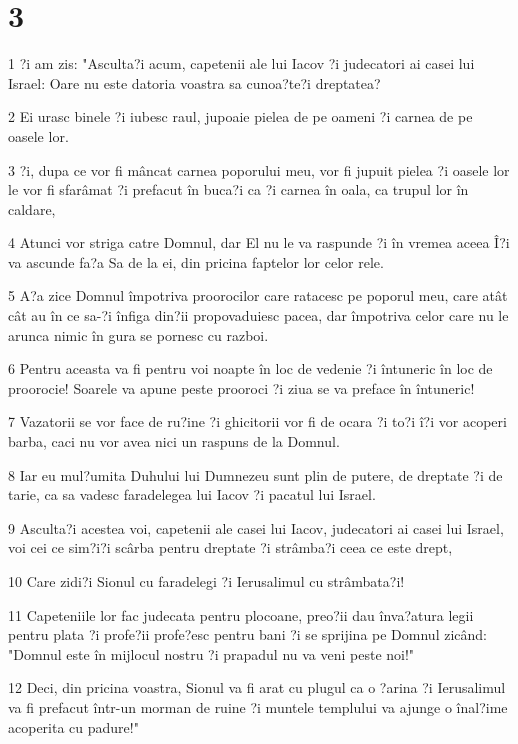 \chapter{3}

\par 1 ?i am zis: "Asculta?i acum, capetenii ale lui Iacov ?i judecatori ai casei lui Israel: Oare nu este datoria voastra sa cunoa?te?i dreptatea?
\par 2 Ei urasc binele ?i iubesc raul, jupoaie pielea de pe oameni ?i carnea de pe oasele lor.
\par 3 ?i, dupa ce vor fi mâncat carnea poporului meu, vor fi jupuit pielea ?i oasele lor le vor fi sfarâmat ?i prefacut în buca?i ca ?i carnea în oala, ca trupul lor în caldare,
\par 4 Atunci vor striga catre Domnul, dar El nu le va raspunde ?i în vremea aceea Î?i va ascunde fa?a Sa de la ei, din pricina faptelor lor celor rele.
\par 5 A?a zice Domnul împotriva proorocilor care ratacesc pe poporul meu, care atât cât au în ce sa-?i înfiga din?ii propovaduiesc pacea, dar împotriva celor care nu le arunca nimic în gura se pornesc cu razboi.
\par 6 Pentru aceasta va fi pentru voi noapte în loc de vedenie ?i întuneric în loc de proorocie! Soarele va apune peste prooroci ?i ziua se va preface în întuneric!
\par 7 Vazatorii se vor face de ru?ine ?i ghicitorii vor fi de ocara ?i to?i î?i vor acoperi barba, caci nu vor avea nici un raspuns de la Domnul.
\par 8 Iar eu mul?umita Duhului lui Dumnezeu sunt plin de putere, de dreptate ?i de tarie, ca sa vadesc faradelegea lui Iacov ?i pacatul lui Israel.
\par 9 Asculta?i acestea voi, capetenii ale casei lui Iacov, judecatori ai casei lui Israel, voi cei ce sim?i?i scârba pentru dreptate ?i strâmba?i ceea ce este drept,
\par 10 Care zidi?i Sionul cu faradelegi ?i Ierusalimul cu strâmbata?i!
\par 11 Capeteniile lor fac judecata pentru plocoane, preo?ii dau înva?atura legii pentru plata ?i profe?ii profe?esc pentru bani ?i se sprijina pe Domnul zicând: "Domnul este în mijlocul nostru ?i prapadul nu va veni peste noi!"
\par 12 Deci, din pricina voastra, Sionul va fi arat cu plugul ca o ?arina ?i Ierusalimul va fi prefacut într-un morman de ruine ?i muntele templului va ajunge o înal?ime acoperita cu padure!"

